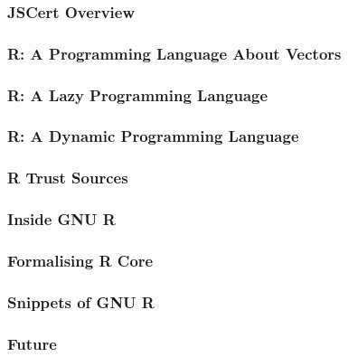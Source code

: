 


\begin{frame}
    \frametitle{JSCert Overview}

\end{frame}


\begin{frame}
    \frametitle{R: A Programming Language About Vectors}


\end{frame}

\begin{frame}
    \frametitle{R: A Lazy Programming Language}

\end{frame}

\begin{frame}
    \frametitle{R: A Dynamic Programming Language}


\end{frame}

\begin{frame}
    \frametitle{R Trust Sources}


\end{frame}

\begin{frame}
    \frametitle{Inside GNU R}


\end{frame}

\begin{frame}
    \frametitle{Formalising R Core}


\end{frame}

\begin{frame}
    \frametitle{Snippets of GNU R}


\end{frame}

\begin{frame}
    \frametitle{Future}


\end{frame}

